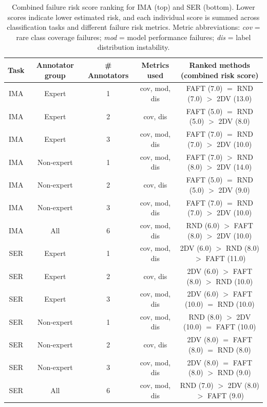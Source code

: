 \documentclass[a4paper,fleqn]{cas-dc}
\begin{document}
\begin{table}
\centering
\caption{Combined failure risk score ranking for IMA (top) and SER (bottom). Lower scores indicate lower estimated risk, and each individual score is summed across classification tasks and different failure risk metrics. Metric abbreviations: \emph{cov} = rare class coverage failures; \emph{mod} = model performance failures; \emph{dis} = label distribution instability.}
\begin{tabular}{ccccc}
\toprule
Task & Annotator group & \# Annotators & Metrics used & Ranked methods (combined risk score) \\
\midrule
IMA & Expert & 1 & cov, mod, dis & FAFT (7.0) $=$ RND (7.0) $>$ 2DV (13.0) \\
IMA & Expert & 2 & cov, dis & FAFT (5.0) $=$ RND (5.0) $>$ 2DV (8.0) \\
IMA & Expert & 3 & cov, mod, dis & FAFT (7.0) $=$ RND (7.0) $>$ 2DV (10.0) \\
IMA & Non-expert & 1 & cov, mod, dis & FAFT (7.0) $>$ RND (8.0) $>$ 2DV (14.0) \\
IMA & Non-expert & 2 & cov, dis & FAFT (5.0) $=$ RND (5.0) $>$ 2DV (9.0) \\
IMA & Non-expert & 3 & cov, mod, dis & FAFT (7.0) $=$ RND (7.0) $>$ 2DV (10.0) \\
IMA & All & 6 & cov, mod, dis & RND (6.0) $>$ FAFT (8.0) $>$ 2DV (10.0) \\
\midrule
SER & Expert & 1 & cov, mod, dis & 2DV (6.0) $>$ RND (8.0) $>$ FAFT (11.0) \\
SER & Expert & 2 & cov, dis & 2DV (6.0) $>$ FAFT (8.0) $>$ RND (10.0) \\
SER & Expert & 3 & cov, mod, dis & 2DV (6.0) $>$ FAFT (10.0) $=$ RND (10.0) \\
SER & Non-expert & 1 & cov, mod, dis & RND (8.0) $>$ 2DV (10.0) $=$ FAFT (10.0) \\
SER & Non-expert & 2 & cov, dis & 2DV (8.0) $=$ FAFT (8.0) $=$ RND (8.0) \\
SER & Non-expert & 3 & cov, mod, dis & 2DV (8.0) $=$ FAFT (8.0) $>$ RND (9.0) \\
SER & All & 6 & cov, mod, dis & RND (7.0) $>$ 2DV (8.0) $>$ FAFT (9.0) \\
\bottomrule
\end{tabular}
\label{table:combined_failure_risk_ranking}
\end{table}
\end{document}
